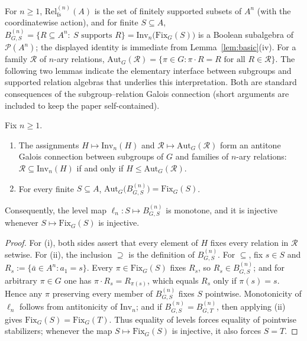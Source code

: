 \documentclass{lmcs}
\newcommand{\Fix}{\mathrm{Fix}}
\newcommand{\Inv}{\mathrm{Inv}}
\newcommand{\Aut}{\mathrm{Aut}}
\newcommand{\Rel}{\mathrm{Rel}}
\newcommand{\fs}{\mathrm{fs}}
\begin{document}
For $n\geq1$, $\Rel^{(n)}_{\fs}(A)$ is the set of finitely
supported subsets of $A^n$ (with the coordinatewise action), and for
finite $S\subseteq A$, $B^{(n)}_{G,S} = \{R\subseteq A^n:\ S\text{ supports }R\} = \Inv_n\bigl(\Fix_G(S)\bigr)$ is a Boolean subalgebra of $\mathcal P(A^n)$; the displayed identity is
immediate from Lemma~\ref{lem:basic}(iv). For a family $\mathcal R$
of $n$-ary relations, $\Aut_G(\mathcal R)=\{\pi\in G:\pi\cdot R=R\text{ for all } R\in\mathcal R\}$. The following two lemmas indicate the elementary interface between subgroups and supported relation algebras that underlies this interpretation. Both are standard consequences of the subgroup--relation Galois connection
(short arguments are included to keep the paper self-contained).

\begin{lem}
\label{lem:galois}
Fix $n\geq1$.
\begin{enumerate}[label=\textup{(\roman*)}]
\item The assignments $H\mapsto\Inv_n(H)$ and
$\mathcal R\mapsto\Aut_G(\mathcal R)$ form an antitone Galois
connection between subgroups of $G$ and families of $n$-ary relations: $\mathcal R\subseteq\Inv_n(H)$ if and only if
$H\leq\Aut_G(\mathcal R)$.
\item For every finite $S\subseteq A$,
$\Aut_G\bigl(B^{(n)}_{G,S}\bigr)=\Fix_G(S)$.
\end{enumerate}
Consequently, the level map $\ell_n:S\mapsto B^{(n)}_{G,S}$ is
monotone, and it is injective whenever $S\mapsto\Fix_G(S)$ is
injective.
\end{lem}
\begin{proof}
For (i), both sides assert that every element of $H$ fixes every relation in $\mathcal R$ setwise. For (ii), the inclusion $\supseteq$ is the
definition of $B^{(n)}_{G,S}$. For $\subseteq$, fix $s\in S$ and 
$R_s:=\{\bar a\in A^n: a_1=s\}$. Every $\pi\in\Fix_G(S)$ fixes
$R_s$, so $R_s\in B^{(n)}_{G,S}$; and for arbitrary $\pi\in G$ one has
$\pi\cdot R_s=R_{\pi(s)}$, which equals $R_s$ only if $\pi(s)=s$.
Hence any $\pi$ preserving every member of $B^{(n)}_{G,S}$ fixes $S$
pointwise. Monotonicity of $\ell_n$ follows from antitonicity of
$\Inv_n$; and if $B^{(n)}_{G,S}=B^{(n)}_{G,T}$, then applying (ii) gives $\Fix_G(S)=\Fix_G(T)$. Thus equality of
levels forces equality of pointwise stabilizers; whenever the map
$S\mapsto\Fix_G(S)$ is injective, it also forces $S=T$.
\end{proof}
\end{document}
